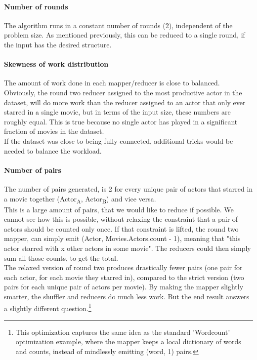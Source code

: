 \documentclass[a4paper,11pt]{article}
\begin{document}
\paragraph{Number of rounds}
The algorithm runs in a constant number of rounds (2), independent of the problem size. As mentioned previously, this can be reduced to a single round, if the input has the desired structure.

\paragraph{Skewness of work distribution}
The amount of work done in each mapper/reducer is close to balanced. Obviously, the round two reducer assigned to the most productive actor in the dataset, will do more work than the reducer assigned to an actor that only ever starred in a single movie, but in terms of the input size, these numbers are roughly equal. This is true because no single actor has played in a significant fraction of movies in the dataset.\\
If the dataset was close to being fully connected, additional tricks would be needed to balance the workload.

\paragraph{Number of pairs}
The number of pairs generated, is 2 for every unique pair of actors that starred in a movie together (Actor\textsubscript{A}, Actor\textsubscript{B}) and vice versa.\\

This is a large amount of pairs, that we would like to reduce if possible. We cannot see how this is possible, without relaxing the constraint that a pair of actors should be counted only once. If that constraint is lifted, the round two mapper, can simply emit (Actor, Movies.Actors.count - 1), meaning that "this actor starred with x other actors in some movie". The reducers could then simply sum all those counts, to get the total.\\
The relaxed version of round two produces drastically fewer pairs (one pair for each actor, for each movie they starred in), compared to the strict version (two pairs for each unique pair of actors per movie). By making the mapper slightly smarter, the shuffler and reducers do much less work. But the end result answers a slightly different question.\footnote{This optimization captures the same idea as the standard 'Wordcount' optimization example, where the mapper keeps a local dictionary of words and counts, instead of mindlessly emitting (word, 1) pairs.}
\end{document}
